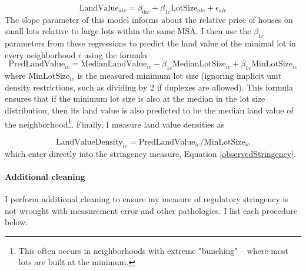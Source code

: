 \documentclass[12pt]{article}
\begin{document}
	\begin{equation}
		\text{LandValue}_{aic} = \beta_{0ic} + \beta_{1c}\text{LotSize}_{aic} + \epsilon_{aic}
	\end{equation}
	The slope parameter of this model informs about the relative price of houses on small lots relative to large lots within the same MSA. I then use the $\beta_{1c}$ parameters from these regressions to predict the land value of the minimal lot in every neighborhood $i$ using the formula 
	\begin{equation}
	 \text{PredLandValue}_{ic} = \text{MedianLandValue}_{ic} - \beta_{1c}\text{MedianLotSize}_{ic} + \beta_{1c}\text{MinLotSize}_{ic}
	\end{equation}
	where $\text{MinLotSize}_{ic}$ is the measured minimum lot size (ignoring implicit unit density restrictions, such as dividing by 2 if duplexes are allowed). This formula ensures that if the minimum lot size is also at the median in the lot size distribution, then its land value is also predicted to be the median land value of the neighborhood\footnote{This often occurs in neighborhoods with extreme "bunching" -- where most lots are built at the minimum.}. Finally, I measure land value densities as 
	
	\begin{equation}
		\text{LandValueDensity}_{ic} = \text{PredLandValue}_{ic}/\text{MinLotSize}_{ic}
	\end{equation}
	which enter directly into the stringency measure, Equation \eqref{observedStringency}.
	
	
	\paragraph*{Additional cleaning} I perform additional cleaning to ensure my measure of regulatory stringency is not wrought with measurement error and other pathologies. I list each procedure below:
	
\end{document}
